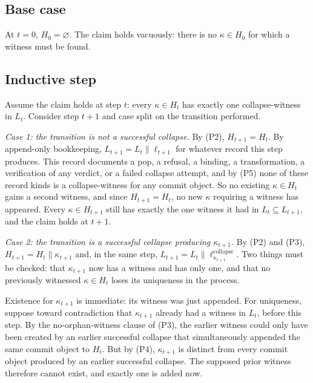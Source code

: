 \documentclass[11pt,openany]{book}
\begin{document}
\subsection{Base case}

At \(t=0\), \(H_0=\varnothing\). The claim holds vacuously: there is no
\(\kappa\in H_0\) for which a witness must be found.

\subsection{Inductive step}

Assume the claim holds at step \(t\): every \(\kappa\in H_t\) has exactly one
collapse-witness in \(L_t\). Consider step \(t+1\) and case split on the
transition performed.

\textit{Case 1: the transition is not a successful collapse.} By (P2),
\(H_{t+1}=H_t\). By append-only bookkeeping,
\(L_{t+1}=L_t\mathbin{\|}\ell_{t+1}\) for whatever record this step produces.
This record documents a pop, a refusal, a binding, a transformation, a
verification of any verdict, or a failed collapse attempt, and by (P5) none of
these record kinds is a collapse-witness for any commit object. So no existing
\(\kappa\in H_t\) gains a second witness, and since \(H_{t+1}=H_t\), no new
\(\kappa\) requiring a witness has appeared. Every
\(\kappa\in H_{t+1}\) still has exactly the one witness it had in
\(L_t\subseteq L_{t+1}\), and the claim holds at \(t+1\).

\textit{Case 2: the transition is a successful collapse producing
\(\kappa_{t+1}\).} By (P2) and (P3),
\(H_{t+1}=H_t\mathbin{\|}\kappa_{t+1}\) and, in the same step,
\(L_{t+1}=L_t\mathbin{\|}
\ell^{\mathrm{collapse}}_{\kappa_{t+1}}\). Two things must be checked: that
\(\kappa_{t+1}\) now has a witness and has only one, and that no previously
witnessed \(\kappa\in H_t\) loses its uniqueness in the process.

Existence for \(\kappa_{t+1}\) is immediate: its witness was just appended.
For uniqueness, suppose toward contradiction that \(\kappa_{t+1}\) already
had a witness in \(L_t\), before this step. By the no-orphan-witness clause of
(P3), the earlier witness could only have been created by an earlier successful
collapse that simultaneously appended the same commit object to \(H_t\). But
by (P4), \(\kappa_{t+1}\) is distinct from every commit object produced by an
earlier successful collapse. The supposed prior witness therefore cannot
exist, and exactly one is added now.
\end{document}
